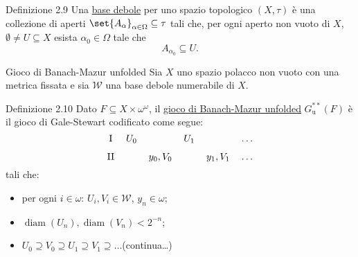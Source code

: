 \documentclass[babel]{beamer}
\renewcommand{\href}[2]{#2}
\begin{document}
\begin{frame}[label={sec:org51bbdfe}]
\begin{block}{Definizione 2.9}
Una \uline{base debole} per uno spazio topologico \((X,\tau)\) è una collezione di aperti \(\set{A_{\alpha}}_{\alpha \in \Omega} \subseteq \tau\) tali che, per ogni aperto non vuoto di \(X\), \(\emptyset\neq U \subseteq X\) esista \(\alpha_{0} \in \Omega\) tale che
\begin{equation*}
A_{\alpha_{0}} \subseteq U.
\end{equation*}
\end{block}
\end{frame}
\begin{frame}[label={sec:org0d40b40}]{Gioco di Banach-Mazur unfolded}
Sia \(X\) uno \href{../../../../../../../org/roam/20250301194013-spazio_polacco.org}{spazio polacco} non vuoto con una \href{../../../../../../../org/roam/20250301193511-spazio_metrico.org}{metrica} fissata e sia \(\mathcal{W}\) una \href{../../../../../../../org/roam/20250525113346-base_debole_di_uno_spazio_topologico.org}{base debole} \href{../../../../../../../org/roam/20250111143651-insieme_numerabile.org}{numerabile} di \(X\).
\begin{block}{Definizione 2.10}
Dato \(F \subseteq X\times \omega^{\omega}\), il \uline{gioco di Banach-Mazur unfolded} \(G^{**}_{\text{u}}(F)\) è il \href{../../../../../../../org/roam/20250513155732-logic_game.org}{gioco} \href{../../../../../../../org/roam/20250513171520-giochi_di_gale_stewart.org}{di Gale-Stewart} codificato come segue:
\begin{equation*}
\begin{tikzcd}[ampersand replacement=\&,cramped,sep=tiny]
	{\text{I}} \& {U_0} \&\& {U_1} \&\& \dots \\
	{\text{II}} \&\& {y_0,V_0} \&\& {y_1, V_{1}} \& \dots
\end{tikzcd}
\end{equation*}
tali che:
\begin{itemize}
\item per ogni \(i \in \omega\): \(U_{i}, V_{i} \in \mathcal{W}\), \(y_{n} \in \omega\);
\item \(\operatorname{diam}(U_{n}), \operatorname{diam}(V_{n}) < 2^{-n}\);
\item \(U_{0}\supseteq V_{0}\supseteq U_{1}\supseteq V_{1}\supseteq \dots\)\hfill (continua\dots{})
\end{itemize}
\end{block}
\end{frame}
\end{document}
